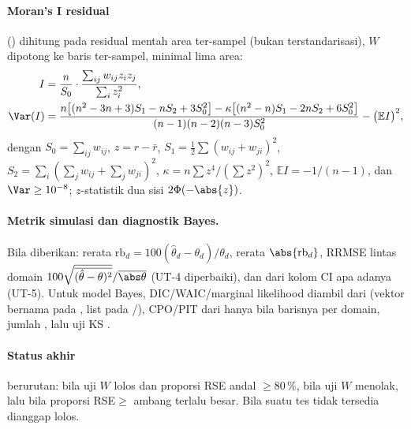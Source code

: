 \paragraph{Moran's I residual} () dihitung pada
residual mentah area ter-sampel (bukan terstandarisasi), $W$ dipotong ke
baris ter-sampel, minimal lima area:
\begin{align}
  I&=\frac{n}{S_0}\cdot\frac{\sum_{ij}w_{ij}z_iz_j}{\sum_i z_i^2},
    \label{eq:moran-I}\\
  \Var(I)&=\frac{
    n\bigl[(n^2-3n+3)S_1-nS_2+3S_0^2\bigr]
    -\kappa\bigl[(n^2-n)S_1-2nS_2+6S_0^2\bigr]}
    {(n-1)(n-2)(n-3)S_0^2}-\bigl(\mathbb E I\bigr)^2,
  \label{eq:moran-var}
\end{align}
dengan $S_0=\sum_{ij}w_{ij}$, $z=r-\bar r$,
$S_1=\tfrac12\sum(w_{ij}+w_{ji})^2$, $S_2=\sum_i(\sum_jw_{ij}+\sum_jw_{ji})^2$,
$\kappa=n\sum z^4/(\sum z^2)^2$, $\mathbb E I=-1/(n-1)$, dan
$\Var\ge10^{-8}$; $z$-statistik dua sisi $2\Phi(-\abs{z})$.

\paragraph{Metrik simulasi dan diagnostik Bayes.} Bila  diberikan:
rerata $\mathrm{rb}_d=100(\hat\theta_d-\theta_d)/\theta_d$, rerata
$\abs{\mathrm{rb}_d}$, RRMSE lintas domain
$100\sqrt{\overline{(\hat\theta-\theta)^2}}/\overline{\abs\theta}$ (UT-4
diperbaiki), dan  dari kolom CI apa adanya (UT-5). Untuk model
Bayes, DIC/WAIC/marginal likelihood diambil dari  (vektor
bernama pada , list pada /),
CPO/PIT dari  hanya bila barisnya per domain, jumlah
, lalu uji KS .

\paragraph{Status akhir} berurutan:  bila uji $W$ lolos dan
proporsi RSE andal $\ge80\,\%$,  bila uji $W$ menolak, lalu
 bila proporsi RSE$\ge$ ambang terlalu besar.
Bila suatu tes tidak tersedia dianggap lolos.


